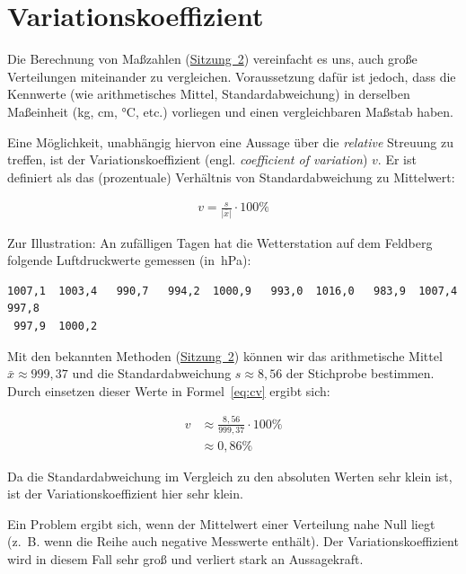 \documentclass[
  11pt,
  ngerman,
  a4paper,
]{report}
\begin{document}
\hypertarget{variationskoeffizient}{%
\section{Variationskoeffizient}\label{variationskoeffizient}}

Die Berechnung von Maßzahlen (\protect\hyperlink{mauxdfzahlen}{Sitzung~2}) vereinfacht es uns, auch große Verteilungen miteinander zu vergleichen. Voraussetzung dafür ist jedoch, dass die Kennwerte (wie arithmetisches Mittel, Standardabweichung) in derselben Maßeinheit (kg, cm, °C, etc.) vorliegen und einen vergleichbaren Maßstab haben.

Eine Möglichkeit, unabhängig hiervon eine Aussage über die \emph{relative} Streuung zu treffen, ist der Variationskoeffizient (engl. \emph{coefficient of variation}) \(v\). Er ist definiert als das (prozentuale) Verhältnis von Standardabweichung zu Mittelwert:

\[\begin{aligned}
v=\frac{s}{|\bar{x}|}\cdot 100\%
\end{aligned}
\label{eq:cv}
\]

Zur Illustration: An zufälligen Tagen hat die Wetterstation auf dem Feldberg folgende Luftdruckwerte gemessen (in~hPa):

\begin{verbatim}
1007,1  1003,4   990,7   994,2  1000,9   993,0  1016,0   983,9  1007,4   997,8  
 997,9  1000,2
\end{verbatim}

Mit den bekannten Methoden (\protect\hyperlink{mauxdfzahlen}{Sitzung~2}) können wir das arithmetische Mittel \(\bar{x}\approx 999,37\) und die Standardabweichung \(s\approx8,56\) der Stichprobe bestimmen. Durch einsetzen dieser Werte in Formel~\eqref{eq:cv} ergibt sich:

\[\begin{aligned}
v&\approx\frac{8{,}56}{999{,}37}\cdot 100\%\\[4pt]
 &\approx0{,}86\%
\end{aligned}
\]

Da die Standardabweichung im Vergleich zu den absoluten Werten sehr klein ist, ist der Variationskoeffizient hier sehr klein.

Ein Problem ergibt sich, wenn der Mittelwert einer Verteilung nahe Null liegt (z.~B. wenn die Reihe auch negative Messwerte enthält). Der Variationskoeffizient wird in diesem Fall sehr groß und verliert stark an Aussagekraft.
\end{document}
